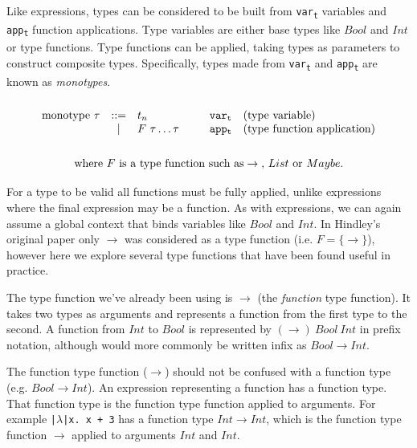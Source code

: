 \documentclass[a4paper,fleqn,oneside,12pt]{report}
\begin{document}
Like expressions, types can be considered to be built from \texttt{var\textsubscript{t}} variables and \texttt{app\textsubscript{t}} function applications. Type variables are either base types like $Bool$ and $Int$ or type functions. Type functions can be applied, taking types as parameters to construct composite types. Specifically, types made from \texttt{var\textsubscript{t}} and \texttt{app\textsubscript{t}} are known as \textit{monotypes}.
$$\begin{array}{lcllll}
  \\
    \textrm{monotype}\ \tau & ::= & t_n               & \hspace{0.25cm} & \mathtt{var_t} & \textrm{(type variable)}\\
                          & \vert & F\ \tau \dots \tau &                 & \mathtt{app_t} & \textrm{(type function application)}\\
  \\
\end{array}
$$
\vspace{-0.8cm}
$$
\textrm{where }F\textrm{ is a type function such as}\rightarrow\textrm{, }List\textrm{ or }Maybe.\\
$$
\vspace{0cm} %

For a type to be valid all functions must be fully applied, unlike expressions where the final expression may be a function. As with expressions, we can again assume a global context that binds variables like $Bool$ and $Int$. In Hindley’s original paper only $\rightarrow$ was considered as a type function (i.e. $F = \{ \rightarrow \}$), however here we explore several type functions that have been found useful in practice.

The type function we've already been using is $\rightarrow$ (the \textit{function} type function). It takes two types as arguments and represents a function from the first type to the second. A function from $Int$ to $Bool$ is represented by $(\rightarrow)\ Bool\ Int$ in prefix notation, although would more commonly be written infix as $Bool \rightarrow Int$.

The function type function ($\rightarrow$) should not be confused with a function type (e.g. $Bool \rightarrow Int$). An expression representing a function has a function type. That function type is the function type function applied to arguments. For example \texttt{|$\lambda$|x. x + 3} has a function type $Int \rightarrow Int$, which is the function type function $\rightarrow$ applied to arguments $Int$ and $Int$.
\end{document}
